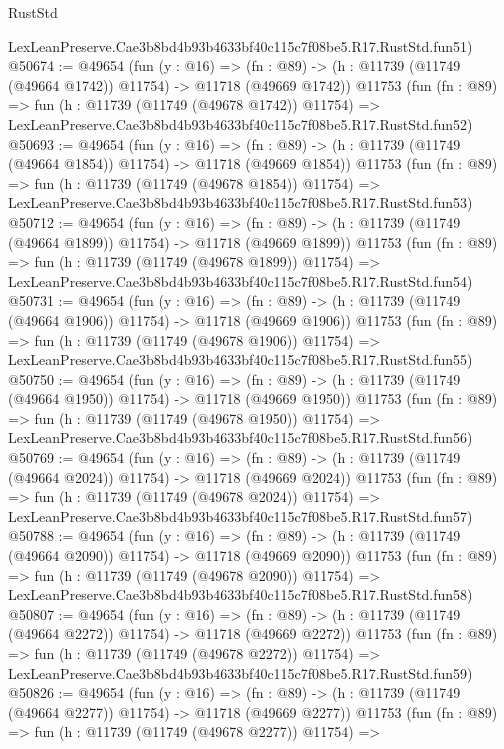 \begin{lexlean}{RustStd}
\begin{coremodule}
    LexLeanPreserve.Cae3b8bd4b93b4633bf40c115c7f08be5.R17.RustStd.fun51)
@50674 := @49654
    (fun (y : @16) =>
    (fn : @89) -> (h : @11739 (@11749 (@49664 @1742)) @11754) -> @11718 (@49669 @1742))
    @11753
    (fun (fn : @89) =>
    fun (h : @11739 (@11749 (@49678 @1742)) @11754) =>
    LexLeanPreserve.Cae3b8bd4b93b4633bf40c115c7f08be5.R17.RustStd.fun52)
@50693 := @49654
    (fun (y : @16) =>
    (fn : @89) -> (h : @11739 (@11749 (@49664 @1854)) @11754) -> @11718 (@49669 @1854))
    @11753
    (fun (fn : @89) =>
    fun (h : @11739 (@11749 (@49678 @1854)) @11754) =>
    LexLeanPreserve.Cae3b8bd4b93b4633bf40c115c7f08be5.R17.RustStd.fun53)
@50712 := @49654
    (fun (y : @16) =>
    (fn : @89) -> (h : @11739 (@11749 (@49664 @1899)) @11754) -> @11718 (@49669 @1899))
    @11753
    (fun (fn : @89) =>
    fun (h : @11739 (@11749 (@49678 @1899)) @11754) =>
    LexLeanPreserve.Cae3b8bd4b93b4633bf40c115c7f08be5.R17.RustStd.fun54)
@50731 := @49654
    (fun (y : @16) =>
    (fn : @89) -> (h : @11739 (@11749 (@49664 @1906)) @11754) -> @11718 (@49669 @1906))
    @11753
    (fun (fn : @89) =>
    fun (h : @11739 (@11749 (@49678 @1906)) @11754) =>
    LexLeanPreserve.Cae3b8bd4b93b4633bf40c115c7f08be5.R17.RustStd.fun55)
@50750 := @49654
    (fun (y : @16) =>
    (fn : @89) -> (h : @11739 (@11749 (@49664 @1950)) @11754) -> @11718 (@49669 @1950))
    @11753
    (fun (fn : @89) =>
    fun (h : @11739 (@11749 (@49678 @1950)) @11754) =>
    LexLeanPreserve.Cae3b8bd4b93b4633bf40c115c7f08be5.R17.RustStd.fun56)
@50769 := @49654
    (fun (y : @16) =>
    (fn : @89) -> (h : @11739 (@11749 (@49664 @2024)) @11754) -> @11718 (@49669 @2024))
    @11753
    (fun (fn : @89) =>
    fun (h : @11739 (@11749 (@49678 @2024)) @11754) =>
    LexLeanPreserve.Cae3b8bd4b93b4633bf40c115c7f08be5.R17.RustStd.fun57)
@50788 := @49654
    (fun (y : @16) =>
    (fn : @89) -> (h : @11739 (@11749 (@49664 @2090)) @11754) -> @11718 (@49669 @2090))
    @11753
    (fun (fn : @89) =>
    fun (h : @11739 (@11749 (@49678 @2090)) @11754) =>
    LexLeanPreserve.Cae3b8bd4b93b4633bf40c115c7f08be5.R17.RustStd.fun58)
@50807 := @49654
    (fun (y : @16) =>
    (fn : @89) -> (h : @11739 (@11749 (@49664 @2272)) @11754) -> @11718 (@49669 @2272))
    @11753
    (fun (fn : @89) =>
    fun (h : @11739 (@11749 (@49678 @2272)) @11754) =>
    LexLeanPreserve.Cae3b8bd4b93b4633bf40c115c7f08be5.R17.RustStd.fun59)
@50826 := @49654
    (fun (y : @16) =>
    (fn : @89) -> (h : @11739 (@11749 (@49664 @2277)) @11754) -> @11718 (@49669 @2277))
    @11753
    (fun (fn : @89) =>
    fun (h : @11739 (@11749 (@49678 @2277)) @11754) =>

\end{coremodule}
\end{lexlean}
